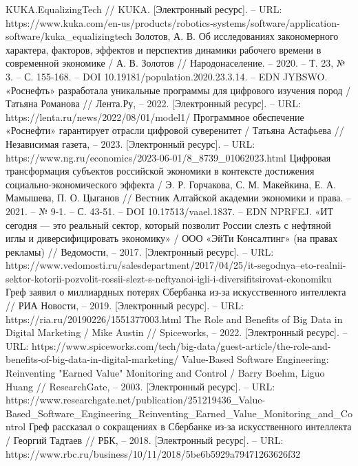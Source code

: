 \documentclass{article}
\begin{document}
\begin{thebibliography}{2}
 KUKA.EqualizingTech // KUKA. [Электронный ресурс]. – URL: https://www.kuka.com/en-us/products/robotics-systems/software/application-software/kuka\_equalizingtech
 Золотов, А. В. Об исследованиях закономерного характера, факторов, эффектов и перспектив динамики рабочего времени в современной экономике / А. В. Золотов // Народонаселение. – 2020. – Т. 23, № 3. – С. 155-168. – DOI 10.19181/population.2020.23.3.14. – EDN JYBSWO.
 «Роснефть» разработала уникальные программы для цифрового изучения пород / Татьяна Романова // Лента.Ру, – 2022. [Электронный ресурс]. – URL: https://lenta.ru/news/2022/08/01/model1/
 Программное обеспечение «Роснефти» гарантирует отрасли цифровой суверенитет / Татьяна Астафьева // Независимая газета, – 2023. [Электронный ресурс]. – URL: https://www.ng.ru/economics/2023-06-01/8\_8739\_01062023.html
 Цифровая трансформация субъектов российской экономики в контексте достижения социально-экономического эффекта / Э. Р. Горчакова, С. М. Макейкина, Е. А. Мамышева, П. О. Цыганов // Вестник Алтайской академии экономики и права. – 2021. – № 9-1. – С. 43-51. – DOI 10.17513/vaael.1837. – EDN NPRFEJ.
 «ИТ сегодня — это реальный сектор, который позволит России слезть с нефтяной иглы и диверсифицировать экономику» / ООО «ЭйТи Консалтинг» (на правах рекламы) // Ведомости, – 2017. [Электронный ресурс]. – URL: https://www.vedomosti.ru/salesdepartment/2017/04/25/it-segodnya--eto-realnii-sektor-kotorii-pozvolit-rossii-slezt-s-neftyanoi-igli-i-diversifitsirovat-ekonomiku
 Греф заявил о миллиардных потерях Сбербанка из-за искусственного интеллекта // РИА Новости, – 2019. [Электронный ресурс]. – URL: https://ria.ru/20190226/1551377003.html
 The Role and Benefits of Big Data in Digital Marketing / Mike Austin // Spiceworks, – 2022. [Электронный ресурс]. – URL: https://www.spiceworks.com/tech/big-data/guest-article/the-role-and-benefits-of-big-data-in-digital-marketing/
 Value-Based Software Engineering: Reinventing "Earned Value" Monitoring and Control / Barry Boehm, Liguo Huang // ResearchGate, – 2003. [Электронный ресурс]. – URL: https://www.researchgate.net/publication/251219436\_Value-Based\_Software\_Engineering\_Reinventing\_Earned\_Value\_Monitoring\_and\_Control
 Греф рассказал о сокращениях в Сбербанке из-за искусственного интеллекта / Георгий Тадтаев // РБК, – 2018. [Электронный ресурс]. – URL:  https://www.rbc.ru/business/10/11/2018/5be6b5929a79471263626f32

\end{thebibliography}
\end{document}
